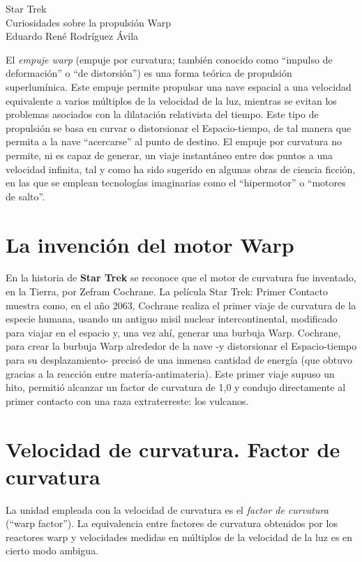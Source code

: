 \documentclass[letterpaper,11pt]{article}
\begin{document}
\begin{center}
	{\Huge {\color{blue}Star Trek}}               \\
    Curiosidades sobre la propulsión Warp \\
   Eduardo René Rodríguez Ávila
\end{center}

El \textit{empuje warp} (empuje por curvatura; también conocido como ``impulso de deformación'' o ``de distorsión'') es una forma teórica de propulsión su\-per\-lu\-mí\-ni\-ca. Este empuje permite propulsar una nave espacial a una velocidad equivalente a varios múltiplos de la velocidad de la luz, mientras se evitan los problemas asociados con la dilatación relativista del tiempo. Este tipo de propulsión se basa en curvar o distorsionar el Espacio-tiempo, de 
tal manera que permita a la nave ``acercarse'' al punto de destino. El empuje por curvatura 
no permite, ni es capaz de generar, un viaje instantáneo entre dos puntos a una velocidad 
infinita, tal y como ha sido sugerido en algunas obras de ciencia ficción, en las que se 
emplean tecnologías imaginarias como el ``hipermotor'' o ``motores de salto''.

	\section{La invención del motor Warp}

En la historia de \textbf{Star Trek} se reconoce que el motor de curvatura fue inventado, en la Tierra, por Zefram Cochrane. La película Star Trek: Primer Contacto muestra como, en el año 2063, Cochrane realiza el primer viaje de curvatura de la especie humana, usando un antiguo misil nuclear intercontinental, modificado para viajar en el espacio y, una vez ahí, generar una 
burbuja Warp. Cochrane, para crear la burbuja Warp alrededor de la nave -y distorsionar el 
Espacio-tiempo para su desplazamiento- precisó de una inmensa cantidad de energía (que 
obtuvo gracias a la reacción entre matería-antimateria). Este primer viaje supuso un hito, 
permitió alcanzar un factor de curvatura de 1,0 y condujo directamente al primer contacto 
con una raza extraterreste: los vulcanos.


	\section{Velocidad de curvatura. Factor de curvatura}

La unidad empleada con la velocidad de curvatura es el \textit{factor de curvatura} (``warp factor''). La equivalencia entre factores de curvatura obtenidos por los reactores warp y velocidades medidas en múltiplos de la velocidad de la luz es en cierto modo ambigua.
\end{document}
